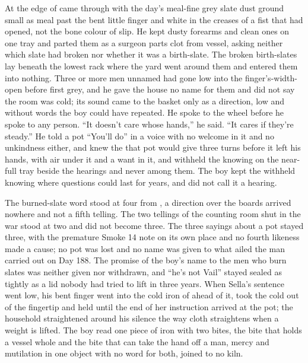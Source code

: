 At the edge of   came through with the day's meal-fine grey slate dust ground small as meal past the bent little finger and white in the creases of a fist that had opened, not the bone colour of slip. He kept dusty forearms and clean ones on one tray and parted them as a surgeon parts clot from vessel, asking neither which slate had broken nor whether it was a birth-slate. The broken birth-slates lay beneath the lowest rack where the yard went around them and entered them into nothing. Three or more men unnamed had gone low into the finger's-width-open  before first grey, and he gave the house no name for them and did not say the room was cold; its sound came to the basket only as a direction, low and without words the boy could have repeated. He spoke to the wheel before he spoke to any person. “It doesn't care whose hands,” he said. “It cares if they're steady.” He told a pot “You'll do” in a voice with no welcome in it and no unkindness either, and knew the  that pot would give three turns before it left his hands, with air under it and a want in it, and withheld the knowing on the near-full tray beside the hearings and never among them. The boy kept the withheld knowing where questions could last for years, and did not call it a hearing.

The burned-slate word stood at four from , a direction over the boards arrived nowhere and not a fifth telling. The two tellings of the counting room shut in the war stood at two and did not become three. The three sayings about a pot stayed three, with the premature Smoke 14 note on its own place and no fourth likeness made a cause; no pot was lost and no name was given to what ailed the man carried out on Day 188. The promise of the boy's name to the men who burn slates was neither given nor withdrawn, and “he's not Vail” stayed sealed as tightly as a lid nobody had tried to lift in three years. When Sella's sentence went low, his bent finger went into the cold iron of  ahead of it, took the cold out of the fingertip and held until the end of her instruction arrived at the pot; the household straightened around his silence the way cloth straightens when a weight is lifted. The boy read one piece of iron with two bites, the bite that holds a vessel whole and the bite that can take the hand off a man, mercy and mutilation in one object with no  word for both, joined to no kiln.

\scenebreak

